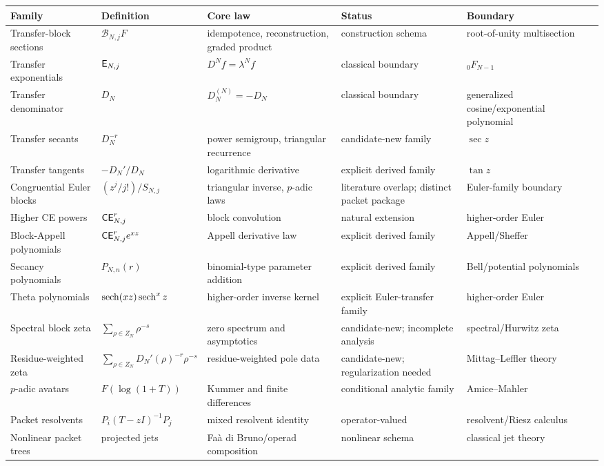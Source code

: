 \begingroup
\scriptsize
\setlength{\tabcolsep}{3pt}
\begin{longtable}{@{}p{.16\linewidth}p{.17\linewidth}p{.19\linewidth}p{.16\linewidth}p{.14\linewidth}@{}}
\toprule
Family & Definition & Core law & Status & Boundary\\
\midrule
\endhead
Transfer-block sections & $\mathcal B_{N,j}F$ & idempotence, reconstruction, graded product & construction schema & root-of-unity multisection\\
Transfer exponentials & $\mathsf E_{N,j}$ & $D^Nf=\lambda^Nf$ & classical boundary & ${}_0F_{N-1}$\\
Transfer denominator & $D_N$ & $D_N^{(N)}=-D_N$ & classical boundary & generalized cosine/exponential polynomial\\
Transfer secants & $D_N^{-r}$ & power semigroup, triangular recurrence & candidate-new family & $\sec z$\\
Transfer tangents & $-D_N'/D_N$ & logarithmic derivative & explicit derived family & $\tan z$\\
Congruential Euler blocks & $(z^j/j!)/S_{N,j}$ & triangular inverse, $p$-adic laws & literature overlap; distinct packet package & Euler-family boundary\\
Higher CE powers & $\mathsf{CE}_{N,j}^r$ & block convolution & natural extension & higher-order Euler\\
Block-Appell polynomials & $\mathsf{CE}_{N,j}^re^{xz}$ & Appell derivative law & explicit derived family & Appell/Sheffer\\
Secancy polynomials & $P_{N,n}(r)$ & binomial-type parameter addition & explicit derived family & Bell/potential polynomials\\
Theta polynomials & $\operatorname{sech}(xz)\operatorname{sech}^xz$ & higher-order inverse kernel & explicit Euler-transfer family & higher-order Euler\\
Spectral block zeta & $\sum_{\rho\in Z_N}\rho^{-s}$ & zero spectrum and asymptotics & candidate-new; incomplete analysis & spectral/Hurwitz zeta\\
Residue-weighted zeta & $\sum_{\rho\in Z_N}D_N'(\rho)^{-r}\rho^{-s}$ & residue-weighted pole data & candidate-new; regularization needed & Mittag--Leffler theory\\
$p$-adic avatars & $F(\log(1+T))$ & Kummer and finite differences & conditional analytic family & Amice--Mahler\\
Packet resolvents & $P_i(T-zI)^{-1}P_j$ & mixed resolvent identity & operator-valued & resolvent/Riesz calculus\\
Nonlinear packet trees & projected jets & Faà di Bruno/operad composition & nonlinear schema & classical jet theory\\
\bottomrule
\end{longtable}
\endgroup

